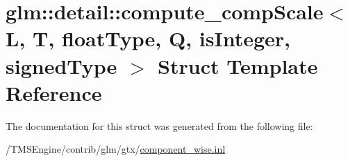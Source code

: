 \hypertarget{structglm_1_1detail_1_1compute__comp_scale}{}\section{glm\+:\+:detail\+:\+:compute\+\_\+comp\+Scale$<$ L, T, float\+Type, Q, is\+Integer, signed\+Type $>$ Struct Template Reference}
\label{structglm_1_1detail_1_1compute__comp_scale}


The documentation for this struct was generated from the following file\+:\begin{DoxyCompactItemize}
\item 
/\+T\+M\+S\+Engine/contrib/glm/gtx/\hyperlink{component__wise_8inl}{component\+\_\+wise.\+inl}\end{DoxyCompactItemize}
